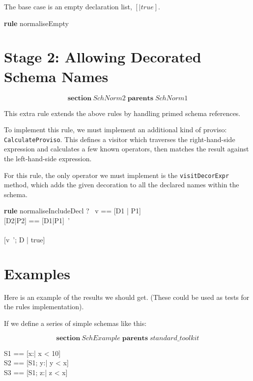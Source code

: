 \documentclass{article}
\newenvironment{zsection}{\[}{\]}
\newcommand{\SECTION}{\textbf{section}~}
\newcommand{\parents}{\mathrel{\textbf{parents}}}
\newenvironment{zedrule}[1]{\par\textbf{rule }#1\vspace{-1ex}\infrule}{\endinfrule}
\newcommand{\derives}{\derive{}}
\newcommand{\proviso}{\raisebox{0.5ex}{${}_{\blacktriangleright}\ $}}%
\begin{document}
The base case is an empty declaration list, $[|true]$.
\begin{zedrule}{normaliseEmpty}
   [~ | true] \unfoldsTo [~ | true]
\end{zedrule}


\section*{Stage 2: Allowing Decorated Schema Names}

\begin{zsection}
  \SECTION SchNorm2 \parents SchNorm1
\end{zsection}

This extra rule extends the above rules by handling primed schema
references.

To implement this rule, we must implement an additional kind of
proviso: \verb!CalculateProviso!.  This defines a visitor which
traverses the right-hand-side expression and calculates a few known
operators, then matches the result against the left-hand-side expression.

For this rule, the only operator we must implement is the
\verb!visitDecorExpr! method, which adds the given decoration to all the
declared names within the schema.

\begin{zedrule}{normaliseIncludeDecl}
   \proviso ?~ v == [D1 | P1] \\
   \proviso [D2|P2] == [D1|P1]~' \\
   [D | true] \unfoldsTo [D3 | P3] \\
\derives
   [v~'; D | true] \unfoldsTo [D2;D3 | P2 \land P3]
\end{zedrule}



\section*{Examples}
Here is an example of the results we should get.
(These could be used as tests for the rules implementation).

If we define a series of simple schemas like this:

\begin{zsection}
  \SECTION SchExample \parents standard\_toolkit 
\end{zsection}

\begin{zed}
  S1 == [x:\nat | x < 10] \\
  S2 == [S1; y:\nat | y < x] \\
  S3 == [S1; z:\nat | z < x]
\end{zed}
\end{document}
